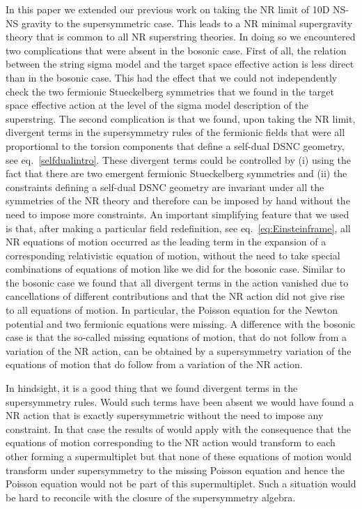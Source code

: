 \documentclass[a4paper,10pt,openany]{article}
\begin{document}
	
	In this paper we extended our previous work on taking the NR limit of 10D NS-NS gravity to the supersymmetric case. This leads to a NR minimal supergravity theory that is common to all NR superstring theories.  In doing so we encountered two complications that were absent in the bosonic case. First of all, the relation between the string sigma model and the target space effective action is less direct than in the bosonic case. This had the effect that we could not independently check the two fermionic Stueckelberg symmetries that we found in the target space effective action at the level of the sigma model description of the superstring. The second complication is that we found, upon taking the NR limit, divergent terms in the supersymmetry rules of the fermionic fields  that were all proportional to the torsion components that define a self-dual DSNC geometry, see eq.~\eqref{selfdualintro}. These divergent terms could be controlled by (i) using the fact that there are two emergent fermionic Stueckelberg symmetries and (ii) the constraints defining a self-dual DSNC geometry are invariant under all the symmetries of the NR theory and therefore can be imposed by hand without the need to impose more constraints. An important simplifying feature that we used is that,  after making a particular field redefinition, see eq.~\eqref{eq:Einsteinframe},  all NR equations of motion occurred as the leading term in the expansion of a corresponding relativistic equation of motion, without the need to take special combinations of equations of motion like we did for the bosonic case. Similar to the bosonic case we found that  all divergent terms in the action vanished due to cancellations of different contributions and that the NR action  did not give rise to all equations of motion. In particular, the Poisson equation for the Newton potential and two fermionic  equations were missing. A  difference with the bosonic case is that the so-called missing equations of motion, that do not follow from a variation of the NR action, can be obtained by a supersymmetry variation of the equations of motion that do follow from a variation of the NR action.
	
	In hindsight, it is a good thing that we found divergent terms in the supersymmetry rules. Would such terms have been absent we would have found a NR action that is exactly supersymmetric without the need to impose any constraint. In that case the results of \cite{Vanhecke:2017chr} would apply with the consequence that the equations of motion corresponding to the NR action would transform to each other forming a supermultiplet but that
	none of these equations of motion would transform under supersymmetry to the missing Poisson equation and hence the Poisson equation would not be part of this supermultiplet. Such a situation would be hard to reconcile with the closure of the supersymmetry algebra.
	
\end{document}
